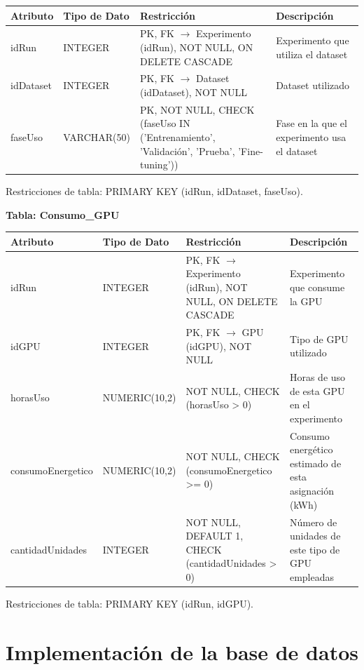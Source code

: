 \documentclass[12pt,a4paper]{article}
\begin{document}
\begin{longtable}{|>{\raggedright\arraybackslash}p{3.45cm}|>{\raggedright\arraybackslash}p{3.45cm}|>{\raggedright\arraybackslash}p{3.45cm}|>{\raggedright\arraybackslash}p{3.45cm}|}
\hline
\textbf{Atributo} & \textbf{Tipo de Dato} & \textbf{Restricción} & \textbf{Descripción} \\
\hline
idRun & INTEGER & PK, FK $\rightarrow$ Experimento (idRun), NOT NULL, ON DELETE CASCADE & Experimento que utiliza el dataset \\
\hline
idDataset & INTEGER & PK, FK $\rightarrow$ Dataset (idDataset), NOT NULL & Dataset utilizado \\
\hline
faseUso & VARCHAR(50) & PK, NOT NULL, CHECK (faseUso IN ('Entrenamiento', 'Validación', 'Prueba', 'Fine-tuning')) & Fase en la que el experimento usa el dataset \\
\hline
\end{longtable}

Restricciones de tabla: PRIMARY KEY (idRun, idDataset, faseUso).

\textbf{Tabla: Consumo\_GPU}

\begin{longtable}{|>{\raggedright\arraybackslash}p{3.45cm}|>{\raggedright\arraybackslash}p{3.45cm}|>{\raggedright\arraybackslash}p{3.45cm}|>{\raggedright\arraybackslash}p{3.45cm}|}
\hline
\textbf{Atributo} & \textbf{Tipo de Dato} & \textbf{Restricción} & \textbf{Descripción} \\
\hline
idRun & INTEGER & PK, FK $\rightarrow$ Experimento (idRun), NOT NULL, ON DELETE CASCADE & Experimento que consume la GPU \\
\hline
idGPU & INTEGER & PK, FK $\rightarrow$ GPU (idGPU), NOT NULL & Tipo de GPU utilizado \\
\hline
horasUso & NUMERIC(10,2) & NOT NULL, CHECK (horasUso > 0) & Horas de uso de esta GPU en el experimento \\
\hline
consumoEnergetico & NUMERIC(10,2) & NOT NULL, CHECK (consumoEnergetico >= 0) & Consumo energético estimado de esta asignación (kWh) \\
\hline
cantidadUnidades & INTEGER & NOT NULL, DEFAULT 1, CHECK (cantidadUnidades > 0) & Número de unidades de este tipo de GPU empleadas \\
\hline
\end{longtable}

Restricciones de tabla: PRIMARY KEY (idRun, idGPU).

\section{Implementación de la base de datos}
\end{document}
